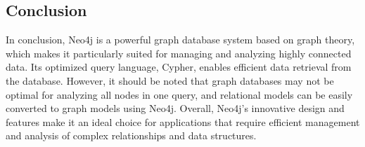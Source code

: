 \subsection{Conclusion} \label{subsec:conclusionNeo4j}

In conclusion, Neo4j is a powerful graph database system based on graph theory, which makes it particularly suited for managing and analyzing highly connected data. Its optimized query language, Cypher, enables efficient data retrieval from the database. However, it should be noted that graph databases may not be optimal for analyzing all nodes in one query, and relational models can be easily converted to graph models using Neo4j. Overall, Neo4j's innovative design and features make it an ideal choice for applications that require efficient management and analysis of complex relationships and data structures.

